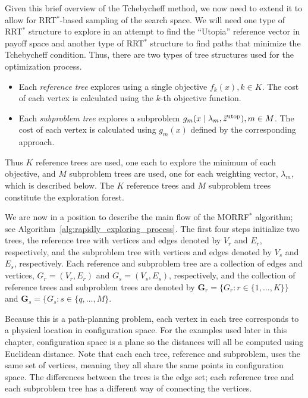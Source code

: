 \documentclass{article}
\begin{document}
Given this brief overview of the Tchebycheff method, we now need to extend it to allow for RRT$^{*}$-based sampling of the search space.  
We will need one type of RRT$^{*}$ structure to explore in an attempt to find the ``Utopia'' reference vector in payoff space and another type of RRT$^{*}$ structure to find paths that minimize the Tchebycheff condition.  
Thus, there are two types of tree structures used for the optimization process.
\begin{itemize}
\item Each \emph{reference tree} explores using a single objective $ f_{k} (x), k \in K $. 
The cost of each vertex is calculated using the $ k $-th objective function.
\item Each \emph{subproblem tree} explores a subproblem $ g_{m} ( x \mid \lambda_{m} , \vec{z}^{\rm utop} ) , m \in M $.
The cost of each vertex is calculated using $ g_{m}(x) $ defined by the corresponding approach.
\end{itemize}
Thus $ K $ reference trees are used, one each to explore the minimum of each objective, and $ M $ subproblem trees are used, one for each weighting vector, $ \lambda_{m} $, which is described below.  
The $K$ reference trees and $M$ subproblem trees constitute the exploration forest.

We are now in a position to describe the main flow of the MORRF$^{*}$ algorithm; see Algorithm~\ref{alg:rapidly_exploring_process}.  
The first four steps initialize two trees, the reference tree with vertices and edges denoted by $V_r$ and $E_r$, respectively, and the subproblem tree with vertices and edges denoted by $V_s$ and $E_s$, respectively.  
Each reference and subproblem tree are a collection of edges and vertices, $G_r=(V_r,E_r)$ and $G_s=(V_s,E_s)$, respectively, and the collection of reference trees and subproblem trees are denoted by ${\mathbf G}_r = \{G_r: r\in \{1, \ldots, K\}\}$ and ${\mathbf G}_s = \{G_s: s \in \{q, \ldots, M\}$.  

Because this is a path-planning problem, each vertex in each tree corresponds to a physical location in configuration space.  
For the examples used later in this chapter, configuration space is a plane so the distances will all be computed using Euclidean distance. 
Note that each each tree, reference and subproblem, uses the same set of vertices, meaning they all share the same points in configuration space.  
The differences between the trees is the edge set; each reference tree and each subproblem tree has a different way of connecting the vertices.
\end{document}
